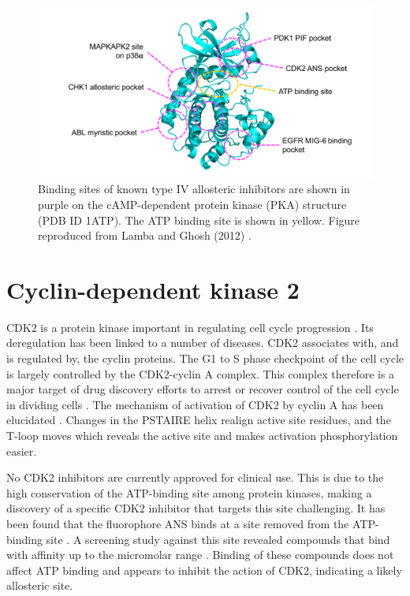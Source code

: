 \begin{figure}
\centering

\includegraphics[width=\textwidth]{figures/kinase_mods/kinase_mods}

\caption{Binding sites of known type IV allosteric inhibitors are shown in purple on the cAMP-dependent protein kinase (PKA) structure (PDB ID 1ATP).
The ATP binding site is shown in yellow.
Figure reproduced from Lamba and Ghosh (2012) \cite{Lamba2012}.}

\label{fig:kinase_mods}
\end{figure}


\section{Cyclin-dependent kinase 2}

CDK2 is a protein kinase important in regulating cell cycle progression \cite{Peyressatre2015}.
Its deregulation has been linked to a number of diseases.
CDK2 associates with, and is regulated by, the cyclin proteins.
The G1 to S phase checkpoint of the cell cycle is largely controlled by the CDK2-cyclin A complex.
This complex therefore is a major target of drug discovery efforts to arrest or recover control of the cell cycle in dividing cells \cite{Betzi2011}.
The mechanism of activation of CDK2 by cyclin A has been elucidated \cite{Jeffrey1995}.
Changes in the PSTAIRE helix realign active site residues, and the T-loop moves which reveals the active site and makes activation phosphorylation easier.

No CDK2 inhibitors are currently approved for clinical use.
This is due to the high conservation of the ATP-binding site among protein kinases, making a discovery of a specific CDK2 inhibitor that targets this site challenging.
It has been found that the fluorophore ANS binds at a site removed from the ATP-binding site \cite{Betzi2011}.
A screening study against this site revealed compounds that bind with affinity up to the micromolar range \cite{Rastelli2014}.
Binding of these compounds does not affect ATP binding and appears to inhibit the action of CDK2, indicating a likely allosteric site.
